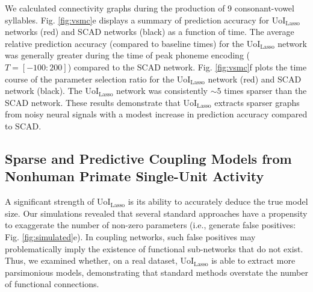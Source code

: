 \documentclass[letterpaper, 10 pt, conference]{ieeeconf}  %
\begin{document}
We calculated connectivity graphs during the production of 9 consonant-vowel syllables. Fig. \ref{fig:vsmc}e displays a summary of prediction accuracy for UoI$_{\text{Lasso}}$ networks (red) and SCAD networks (black) as a function of time. The average relative prediction accuracy (compared to baseline times) for the UoI$_{\text{Lasso}}$ network was generally greater during the time of peak phoneme encoding ($T = \left[-100:200\right]$) compared to the SCAD network. Fig. \ref{fig:vsmc}f plots the time course of the parameter selection ratio for the UoI$_{\text{Lasso}}$ network (red) and SCAD network (black). The UoI$_{\text{Lasso}}$ network was consistently $\sim5$ times sparser than the SCAD network. These results demonstrate that UoI$_{\text{Lasso}}$ extracts sparser graphs from noisy neural signals with a modest increase in prediction accuracy compared to SCAD.


\subsection{Sparse and Predictive Coupling Models from Nonhuman Primate Single-Unit Activity}
A significant strength of UoI$_{\text{Lasso}}$ is its ability to accurately deduce the true model size. Our simulations revealed that several standard approaches have a propensity to exaggerate the number of non-zero parameters (i.e., generate false positives: Fig. \ref{fig:simulated}e). In coupling networks, such false positives may problematically imply the existence of functional sub-networks that do not exist. Thus, we examined whether, on a real dataset, UoI$_{\text{Lasso}}$ is able to extract more parsimonious models, demonstrating that standard methods overstate the number of functional connections.
\end{document}
